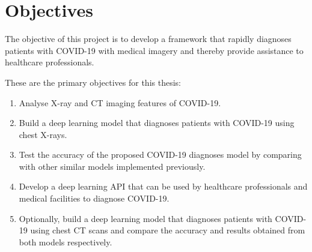 



\section{Objectives}

The objective of this project is to develop a framework 
that rapidly diagnoses patients with COVID-19 with medical imagery and thereby provide assistance to healthcare professionals.

These are the primary objectives for this thesis:
\begin{enumerate}
    \item Analyse X-ray and CT imaging features of COVID-19. 
    \item Build a deep learning model that diagnoses patients with COVID-19 using chest X-rays. 
    \item Test the accuracy of the proposed COVID-19 diagnoses model by comparing with other similar models implemented previously. 
    \item Develop a deep learning API that can be used by healthcare professionals and medical facilities to diagnose COVID-19.
    \item Optionally, build a deep learning model that diagnoses patients with COVID-19 using chest CT scans and compare the accuracy and results obtained from both models respectively.
  \end{enumerate}

